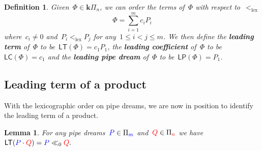 \documentclass{amsart}
\newtheorem{lemma}[theorem]{Lemma}
\newtheorem{definition}[theorem]{Definition}
\theoremstyle{definition}
\newcommand{\bk}{\mathbf{k}} %
\renewcommand{\b}[1]{{\color{blue} #1}} %
\renewcommand{\r}[1]{{\color{red} #1}} %
\newcommand{\defn}[1]{\textbf{\textsf{\color{PineGreen} #1}}} %
\newcommand{\pipeDreams}{\Pi} %
\newcommand{\HP}{{\bk\pipeDreams}} %
\newcommand{\gammainsertion}{\ll}  %
\newcommand{\ltlex}{<_{\mathrm{lex}}} %
\newcommand{\product}{\cdot} %
\newcommand{\leadingTerm}{\mathsf{LT}} %
\newcommand{\leadingCoefficient}{\mathsf{LC}} %
\newcommand{\leadingPipeDream}{\mathsf{LP}} %
\begin{document}
\begin{definition}
Given~$\Phi \in \HP_n$, we can order the terms of~$\Phi$ with respect to~$\ltlex$ 
\[
\Phi = \sum_{i=1}^m c_i P_i
\]
where~$c_i \ne 0$ and~$P_i \ltlex P_j$ for any~$1 \le i < j \le m$. We then define the \defn{leading term} of~$\Phi$ to be~$\leadingTerm(\Phi) = c_1 P_1$, the \defn{leading coefficient} of~$\Phi$ to be~$\leadingCoefficient(\Phi) = c_1$ and the \defn{leading pipe dream} of~$\Phi$ to be~$\leadingPipeDream(\Phi) = P_1$.
\end{definition}


\subsection{Leading term of a product}
\label{subsec:leadingTermProduct}

With the lexicographic order on pipe dreams, we are now in position to identify the leading term of a product.

\begin{lemma}
\label{lem:LTproductroduct}
For any pipe dreams~$\b{P} \in \pipeDreams_{\b{m}}$ and~$\r{Q} \in \pipeDreams_{\r{n}}$ we have
\(
\leadingTerm({\b{P} \product \r{Q}})={\b{P} \gammainsertion_0 \r{Q}}.
\)
\end{lemma}
  
\end{document}
